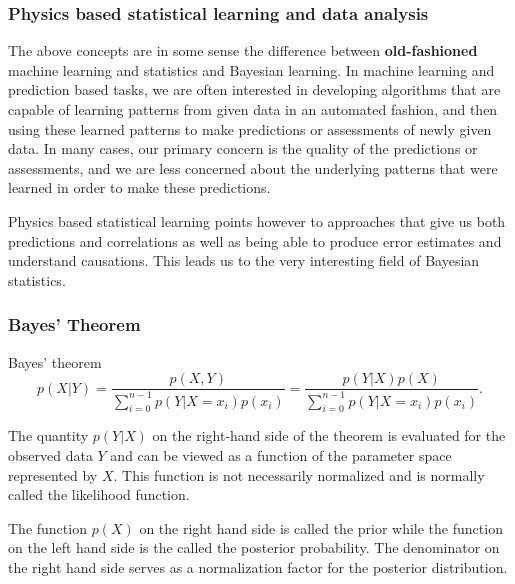 \documentclass{beamer}
\begin{document}
\begin{frame}
\frametitle{Physics based statistical learning and data analysis}

The above concepts are in some sense the difference between \textbf{old-fashioned} machine
learning and statistics and Bayesian learning. In machine learning and prediction based
tasks, we are often interested in developing algorithms that are
capable of learning patterns from given data in an automated fashion,
and then using these learned patterns to make predictions or
assessments of newly given data. In many cases, our primary concern
is the quality of the predictions or assessments, and we are less
concerned about the underlying patterns that were learned in order
to make these predictions.

Physics based statistical learning points however to approaches that give us both predictions and correlations as well as being able to produce error estimates and understand causations.  This leads us to the very interesting field of Bayesian statistics.
\end{frame}

\begin{frame}
\frametitle{Bayes' Theorem}

Bayes' theorem
\[
p(X\vert Y)= \frac{p(X,Y)}{\sum_{i=0}^{n-1}p(Y\vert X=x_i)p(x_i)}=\frac{p(Y\vert X)p(X)}{\sum_{i=0}^{n-1}p(Y\vert X=x_i)p(x_i)}.
\]

The quantity $p(Y\vert X)$ on the right-hand side of the theorem is
evaluated for the observed data $Y$ and can be viewed as a function of
the parameter space represented by $X$. This function is not
necessarily normalized and is normally called the likelihood function.

The function $p(X)$ on the right hand side is called the prior while the function on the left hand side is the called the posterior probability. The denominator on the right hand side serves as a normalization factor for the posterior distribution.
\end{frame}
\end{document}
